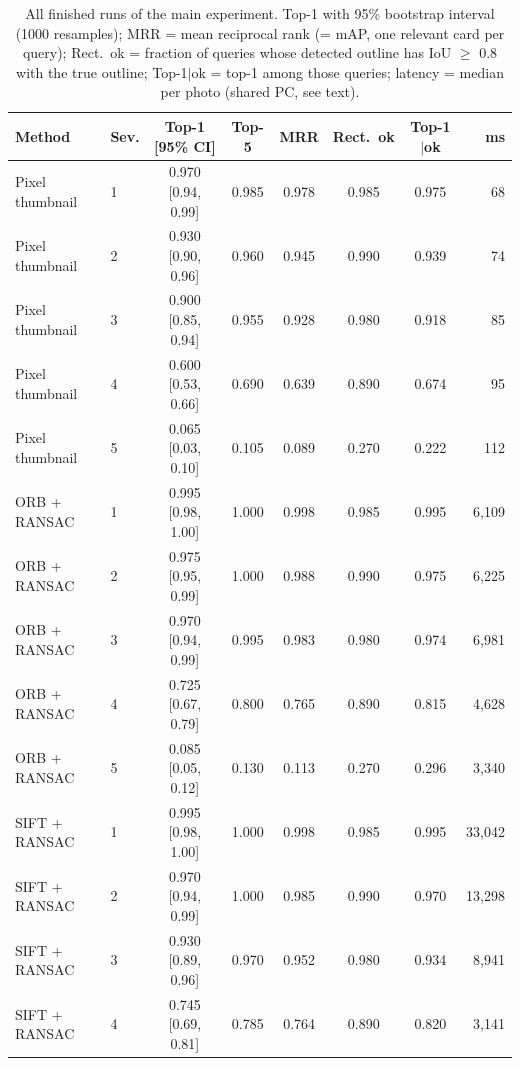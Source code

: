 \begin{table}[p]\centering\scriptsize\renewcommand{\arraystretch}{0.92}
\caption[All finished single-card runs]{All finished runs of the main experiment. Top-1 with 95\% bootstrap interval (1000 resamples); MRR = mean reciprocal rank (= mAP, one relevant card per query); Rect.\ ok = fraction of queries whose detected outline has IoU $\geq$ 0.8 with the true outline; Top-1$\mid$ok = top-1 among those queries; latency = median per photo (shared PC, see text).}
\label{tab:main-detail}
\begin{tabular}{@{}llcccccr@{}}
\toprule
Method & Sev. & Top-1 [95\% CI] & Top-5 & MRR & Rect.\ ok & Top-1$\mid$ok & ms \\
\midrule
Pixel thumbnail & 1 & 0.970 {\scriptsize[0.94, 0.99]} & 0.985 & 0.978 & 0.985 & 0.975 & 68\\
Pixel thumbnail & 2 & 0.930 {\scriptsize[0.90, 0.96]} & 0.960 & 0.945 & 0.990 & 0.939 & 74\\
Pixel thumbnail & 3 & 0.900 {\scriptsize[0.85, 0.94]} & 0.955 & 0.928 & 0.980 & 0.918 & 85\\
Pixel thumbnail & 4 & 0.600 {\scriptsize[0.53, 0.66]} & 0.690 & 0.639 & 0.890 & 0.674 & 95\\
Pixel thumbnail & 5 & 0.065 {\scriptsize[0.03, 0.10]} & 0.105 & 0.089 & 0.270 & 0.222 & 112\\
ORB + RANSAC & 1 & 0.995 {\scriptsize[0.98, 1.00]} & 1.000 & 0.998 & 0.985 & 0.995 & 6,109\\
ORB + RANSAC & 2 & 0.975 {\scriptsize[0.95, 0.99]} & 1.000 & 0.988 & 0.990 & 0.975 & 6,225\\
ORB + RANSAC & 3 & 0.970 {\scriptsize[0.94, 0.99]} & 0.995 & 0.983 & 0.980 & 0.974 & 6,981\\
ORB + RANSAC & 4 & 0.725 {\scriptsize[0.67, 0.79]} & 0.800 & 0.765 & 0.890 & 0.815 & 4,628\\
ORB + RANSAC & 5 & 0.085 {\scriptsize[0.05, 0.12]} & 0.130 & 0.113 & 0.270 & 0.296 & 3,340\\
SIFT + RANSAC & 1 & 0.995 {\scriptsize[0.98, 1.00]} & 1.000 & 0.998 & 0.985 & 0.995 & 33,042\\
SIFT + RANSAC & 2 & 0.970 {\scriptsize[0.94, 0.99]} & 1.000 & 0.985 & 0.990 & 0.970 & 13,298\\
SIFT + RANSAC & 3 & 0.930 {\scriptsize[0.89, 0.96]} & 0.970 & 0.952 & 0.980 & 0.934 & 8,941\\
SIFT + RANSAC & 4 & 0.745 {\scriptsize[0.69, 0.81]} & 0.785 & 0.764 & 0.890 & 0.820 & 3,141\\

\end{tabular}
\end{table}

